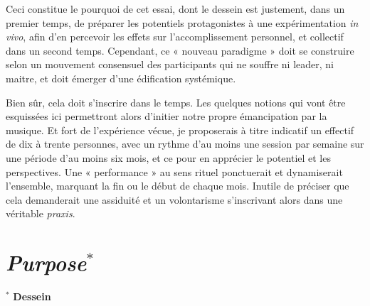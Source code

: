 \documentclass{article}
\begin{document}
\bigskip
Ceci constitue le pourquoi de cet essai, dont le dessein est justement, dans un premier temps, de préparer les potentiels protagonistes à une expérimentation \textit{in vivo}, afin d'en percevoir les effets sur l'accomplissement personnel, et collectif dans un second temps. Cependant, ce « nouveau paradigme » doit se construire selon un mouvement consensuel des participants qui ne souffre ni leader, ni  maitre, et doit émerger d'une édification systémique. 

Bien sûr, cela doit s'inscrire dans le temps. Les quelques notions qui vont être esquissées ici permettront alors d'initier notre propre émancipation par la musique. 
Et fort de l'expérience vécue, je proposerais à titre indicatif un effectif de dix à trente personnes, avec un rythme d'au moins une session par semaine sur une période d'au moins six mois, et ce pour en apprécier le potentiel et les perspectives. 
Une « performance » au sens rituel ponctuerait et dynamiserait l'ensemble, marquant la fin ou le début de chaque mois. Inutile de préciser que cela demanderait une assiduité et un volontarisme s'inscrivant alors dans une véritable \textit{praxis}. 

\section*{\textsl{Purpose}$^\ast$}
$^\ast$ \textbf{Dessein}
\label{purpose}
\end{document}
